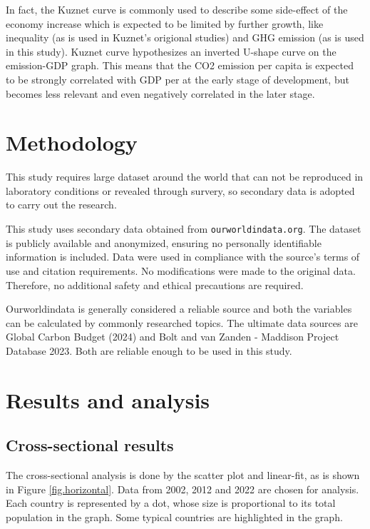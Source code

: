 \documentclass[a4paper]{article}
\begin{document}
In fact, the Kuznet curve is commonly used to describe some side-effect of the economy increase which is expected to be limited by further growth, like inequality (as is used in Kuznet's origional studies) and GHG emission (as is used in this study). Kuznet curve hypothesizes an inverted U-shape curve on the emission-GDP graph. This means that the CO2 emission per capita is expected to be strongly correlated with GDP per at the early stage of development, but becomes less relevant and even negatively correlated in the later stage.

\section{Methodology}

This study requires large dataset around the world that can not be reproduced in laboratory conditions or revealed through survery, so secondary data is adopted to carry out the research.

This study uses secondary data obtained from \texttt{ourworldindata.org}. The dataset is publicly available and anonymized, ensuring no personally identifiable information is included. Data were used in compliance with the source's terms of use and citation requirements. No modifications were made to the original data. Therefore, no additional safety and ethical precautions are required.

Ourworldindata is generally considered a reliable source and both the variables can be calculated by commonly researched topics. The ultimate data sources are Global Carbon Budget (2024) and Bolt and van Zanden - Maddison Project Database 2023. Both are reliable enough to be used in this study.


\section{Results and analysis}

\subsection{Cross-sectional results}

The cross-sectional analysis is done by the scatter plot and linear-fit, as is shown in Figure \ref{fig.horizontal}. Data from 2002, 2012 and 2022 are chosen for analysis. Each country is represented by a dot, whose size is proportional to its total population in the graph. Some typical countries are highlighted in the graph.
\end{document}
